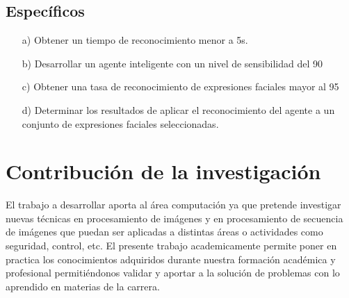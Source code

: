 \subsection{Específicos}

\begin{enumerate}
\item[a)] Obtener un tiempo de reconocimiento menor a 5s.
\item[b)] Desarrollar un agente inteligente con un nivel de sensibilidad del 90%
\item[c)] Obtener una tasa de reconocimiento de expresiones faciales mayor al 95%
\item[d)] Determinar los resultados de aplicar el reconocimiento del agente a un conjunto de
expresiones faciales seleccionadas.
\end{enumerate}

\section{Contribución de la investigación}

El trabajo a desarrollar aporta al área computación ya que pretende investigar nuevas técnicas
en procesamiento de imágenes y en procesamiento de secuencia de imágenes que puedan
ser aplicadas a distintas áreas o actividades como seguridad, control, etc.
\vskip 0.3cm
El presente trabajo academicamente permite poner en practica los conocimientos adquiridos
durante nuestra formación académica y profesional permitiéndonos validar y aportar a la
solución de problemas con lo aprendido en materias de la carrera. 

